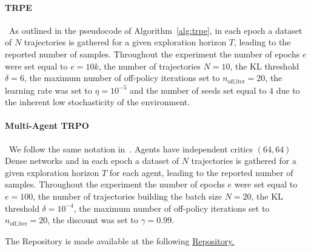 \paragraph*{TRPE}~As outlined in the pseudocode of Algorithm~\ref{alg:trpe}, in each epoch a dataset of $N$ trajectories is gathered for a given exploration horizon $T$, leading to the reported number of samples. Throughout the experiment the number of epochs $e$ were set equal to $e=10k$, the number of trajectories $N=10$, the KL threshold $\delta = 6$, the maximum number of off-policy iterations set to $n_{\text{off,iter}} = 20$, the learning rate was set to $\eta = 10^{-5}$ and the number of seeds set equal to $4$ due to the inherent low stochasticity of the environment.

\paragraph*{Multi-Agent TRPO}~We follow the same notation in~\citet{duan2016benchmarking}. Agents have independent critics $(64,64)$ Dense networks and in each epoch a dataset of $N$ trajectories is gathered for a given exploration horizon $T$ for each agent, leading to the reported number of samples. Throughout the experiment the number of epochs $e$ were set equal to $e=100$, the number of trajectories building the batch size $N=20$, the KL threshold $\delta = 10^{-4}$, the maximum number of off-policy iterations set to $n_{\text{off,iter}} = 20$, the discount was set to $\gamma = 0.99$.


The Repository is made available at the following \href{https://anonymous.4open.science/r/trpe-DB16/README.md}{Repository.}

%
\newpage

 


